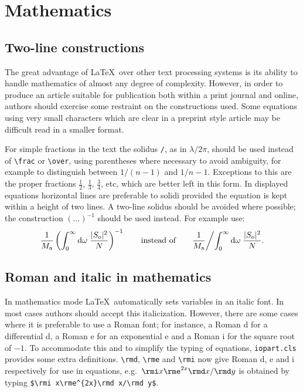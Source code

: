 \documentclass[12pt]{iopart}
\begin{document}
\section{Mathematics}
\subsection{Two-line constructions}
The great advantage of \LaTeX\ 
over other text processing systems is its 
ability to handle mathematics of almost any degree of complexity. However, 
in order to produce an article suitable for publication both within a print journal and online, 
authors should exercise some restraint on the constructions used. Some equations using very small characters which are clear in a preprint style article may be difficult read in a smaller format.

For simple fractions in the text the solidus \verb"/", as in 
$\lambda/2\pi$, should be used instead of \verb"\frac" or \verb"\over", 
using parentheses where necessary to avoid ambiguity, 
for example to distinguish between $1/(n-1)$ and $1/n-1$. Exceptions to 
this are the proper fractions $\frac12$, $\frac13$, $\frac34$, 
etc, which are better left in this form. In displayed equations 
horizontal lines are preferable to solidi provided the equation is 
kept within a height of two lines. A two-line solidus should be 
avoided where possible; the construction $(\ldots)^{-1}$ should be 
used instead. For example use:
\begin{equation*}
\frac{1}{M_{\rm a}}\left(\int^\infty_0{\rm d}
\omega\;\frac{|S_o|^2}{N}\right)^{-1}\qquad\mbox{instead of}\qquad
\frac{1}{M_{\rm a}}\biggl/\int^\infty_0{\rm d}
\omega\;\frac{|S_o|^2}{N}.
\end{equation*}

\subsection{Roman and italic in mathematics}
In mathematics mode \LaTeX\ automatically sets variables in an italic 
font. In most cases authors should accept this italicization. However, 
there are some cases where it is preferable to use a Roman font; for 
instance, a Roman d for a differential d, a Roman e 
for an exponential e and a Roman i for the square root of $-1$. To 
accommodate this and to simplify the  typing of equations, \verb"iopart.cls" provides
some extra definitions. \verb"\rmd", \verb"\rme" and \verb"\rmi" 
now give Roman d, e and i respectively for use in equations, 
e.g.\ $\rmi x\rme^{2x}\rmd x/\rmd y$ 
is obtained by typing \verb"$\rmi x\rme^{2x}\rmd x/\rmd y$". 
 
\end{document}
